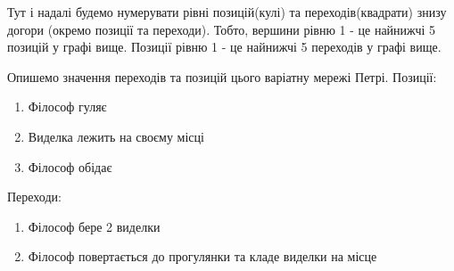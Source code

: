 \begin{center}
\end{center}

Тут і надалі будемо нумерувати рівні позицій(кулі) та переходів(квадрати) знизу догори
(окремо позиції та переходи).
Тобто, вершини рівню 1 - це найнижчі 5 позицій у графі вище.
Позиції рівню 1 - це найнижчі 5 переходів у графі вище.

Опишемо значення переходів та позицій цього варіатну мережі Петрі.
Позиції:
\begin{enumerate}
    \item Філософ гуляє
    \item Виделка лежить на своєму місці
    \item Філософ обідає
\end{enumerate}

Переходи:
\begin{enumerate}
    \item Філософ бере 2 виделки
    \item Філософ повертається до прогулянки та кладе виделки на місце
\end{enumerate}
